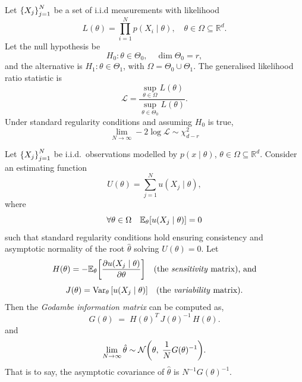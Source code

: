 \begin{theorem}
\noproofref
\noproofref
    Let \(\qty{X_j}_{j=1}^N\) be a set of i.i.d measurements with likelihood
    \[
        L(\theta)=\prod_{i=1}^{N}p(X_{i}\mid\theta), \quad \theta\in\Omega\subseteq\mathbb{R}^{d}.
    \]
    Let the null hypothesis be
    \[
        H_{0}:\theta\in\Theta_{0},\quad \dim\Theta_{0}=r,
    \]
    and the alternative is \(H_{1}:\theta\in\Theta_{1}\), with \(\Omega=\Theta_{0}\cup\Theta_{1}\). The generalised likelihood ratio statistic is
    \[
        \mathcal L = \frac{\sup_{\theta\in\Omega}L(\theta)}
            {\sup_{\theta\in\Theta_{0}}L(\theta)}.
    \]
    Under standard regularity conditions and assuming \(H_{0}\) is true, 
    \[
        \lim_{N\to\infty} -2\log \mathcal L \sim\chi^2_{d-r}
    \]
\end{theorem}

\begin{theorem}
\noproofref
            \noproofref
            
                Let \(\qty{X_j}_{j=1}^N\) be i.i.d.\ observations modelled by \(p(x\mid\theta)\), \(\theta\in\Omega\subseteq\mathbb{R}^{d}\).  Consider an estimating function
                \[
                    U(\theta) =\sum_{j=1}^{N}u(X_{j}\mid\theta),
                \]
                where 
                \[
                    \forall\theta\in\Omega\quad\mathbb{E}_{\theta}\qty[u(X_{j}\mid\theta)]=0
                \]
                such that standard regularity conditions hold ensuring consistency and asymptotic normality of the root \(\hat\theta\) solving \(U(\theta)=0\).  Let
                \[
                    H(\theta) =-\mathbb{E}_{\theta}\qty[\pdv{u(X_{j}\mid\theta)}{\theta}] \quad\text{(the \emph{sensitivity} matrix), and}
                \]
                \[
                    J(\theta) =\operatorname{Var}_{\theta}\qty[u(X_{j}\mid\theta)] \quad\text{(the \emph{variability} matrix).}
                \]
                Then the \emph{Godambe information matrix} can be computed as,
                \[
                    G(\theta) \;=\; H(\theta)^{T}\,J(\theta)^{-1}\,H(\theta).
                \]
                and
                \[
                \lim_{N\to\infty}\hat\theta \sim \mathcal{N}\qty(\theta,\;\frac1NG(\theta)^{-1}).
                \]
                That is to say, the asymptotic covariance of \(\hat\theta\) is \(N^{-1}G(\theta)^{-1}\).
            \end{theorem}

